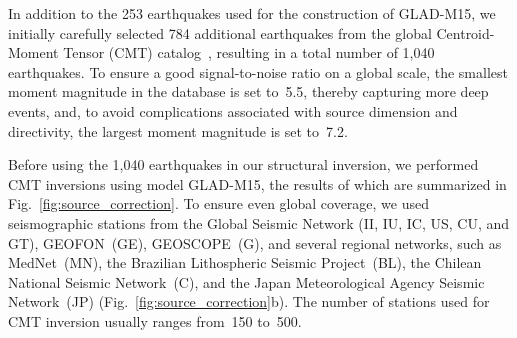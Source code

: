 In addition to the 253 earthquakes used for the construction of GLAD-M15, we initially carefully selected 784 additional earthquakes
from the global Centroid-Moment Tensor (CMT) catalog~\cite{ekstrom2012global},
resulting in a total number of 1,040 earthquakes.
To ensure a good signal-to-noise ratio on a global scale,
the smallest moment magnitude in the database is set to~5.5,
thereby capturing more deep events,
and, to avoid complications associated with source dimension and directivity,
the largest moment magnitude is set to~7.2.

Before using the 1,040 earthquakes in our structural inversion,
we performed CMT inversions using model GLAD-M15,
the results of which are summarized in Fig.~\ref{fig:source_correction}.
To ensure even global coverage,
we used seismographic stations from the  Global Seismic Network (II, IU, IC, US, CU, and GT),
GEOFON~(GE), GEOSCOPE~(G), and several regional networks, such as MedNet~(MN),
the Brazilian Lithospheric Seismic Project~(BL), the Chilean National Seismic Network~(C),
and the Japan Meteorological Agency Seismic Network~(JP) (Fig.~\ref{fig:source_correction}b).
The number of stations used for CMT inversion usually ranges
from~150 to~500.

